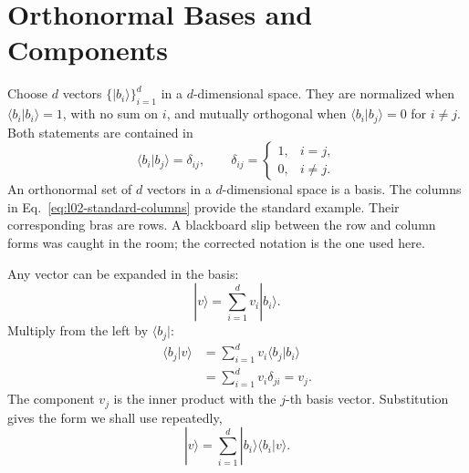 \begin{classroomqa}
\end{classroomqa}

\begin{classroomqa}
\end{classroomqa}

\section{Orthonormal Bases and Components}

Choose \(d\) vectors \(\{|b_i\rangle\}_{i=1}^{d}\) in a
\(d\)-dimensional space. They are normalized when
\(\langle b_i|b_i\rangle=1\), with no sum on \(i\), and mutually orthogonal
when \(\langle b_i|b_j\rangle=0\) for \(i\neq j\). Both statements are
contained in
\begin{equation}
 \langle b_i|b_j\rangle=\delta_{ij},
 \qquad
 \delta_{ij}=
 \begin{cases}
  1,&i=j,\\
  0,&i\neq j.
 \end{cases}
 \label{eq:l02-orthonormal}
\end{equation}
An orthonormal set of \(d\) vectors in a \(d\)-dimensional space is a basis.
The columns in Eq.~\eqref{eq:l02-standard-columns} provide the standard
example. Their corresponding bras are rows. A blackboard slip between the
row and column forms was caught in the room; the corrected notation is the
one used here.

Any vector can be expanded in the basis:
\begin{equation}
 |v\rangle=\sum_{i=1}^{d}v_i|b_i\rangle.
 \label{eq:l02-basis-expansion}
\end{equation}
Multiply from the left by \(\langle b_j|\):
\begin{align}
 \langle b_j|v\rangle
 &=\sum_{i=1}^{d}v_i\langle b_j|b_i\rangle\\
 &=\sum_{i=1}^{d}v_i\delta_{ji}
 =v_j.
 \label{eq:l02-component-extraction}
\end{align}
The component \(v_j\) is the inner product with the \(j\)-th basis vector.
Substitution gives the form we shall use repeatedly,
\begin{equation}
 |v\rangle
 =\sum_{i=1}^{d}|b_i\rangle\langle b_i|v\rangle.
 \label{eq:l02-completeness-action}
\end{equation}

